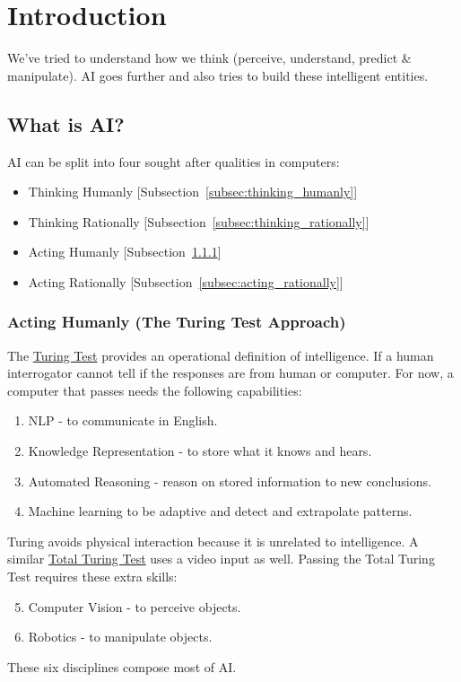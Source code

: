 \chapter{Introduction} %
\label{cha:introduction}

We've tried to understand how we think (perceive, understand, predict \&
manipulate). AI goes further and also tries to build these intelligent entities.

\section{What is AI?} %
\label{sec:what_is_ai_}
AI can be split into four sought after qualities in computers:
\begin{itemize}
    \item Thinking Humanly [Subsection~\ref{subsec:thinking_humanly}]
    \item Thinking Rationally [Subsection~\ref{subsec:thinking_rationally}]
    \item Acting Humanly [Subsection~\ref{subsec:acting_humanly}]
    \item Acting Rationally [Subsection~\ref{subsec:acting_rationally}]
\end{itemize}

\subsection{Acting Humanly (The Turing Test Approach)} %
\label{subsec:acting_humanly}
The \uline{Turing Test} provides an operational definition of intelligence.
If a human interrogator cannot tell if the responses are from human or computer.
For now, a computer that passes needs the following capabilities:
\begin{enumerate}
    \item NLP - to communicate in English.
    \item Knowledge Representation - to store what it knows and hears.
    \item Automated Reasoning - reason on stored information to new conclusions.
    \item Machine learning to be adaptive and detect and extrapolate patterns.
\end{enumerate}
Turing avoids physical interaction because it is unrelated to intelligence.
A similar \uline{Total Turing Test} uses a video input as well.
Passing the Total Turing Test requires these extra skills:
\begin{enumerate}
    \setcounter{enumi}{4}
    \item Computer Vision - to perceive objects.
    \item Robotics - to manipulate objects.
\end{enumerate}
These six disciplines compose most of AI.

